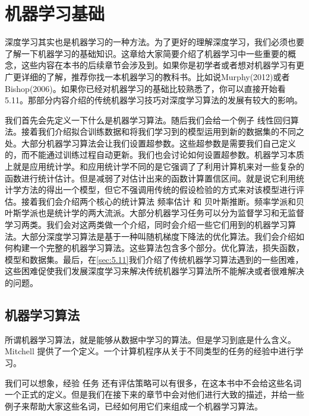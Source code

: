 \chapter{机器学习基础}
\label{chap:5}

深度学习其实也是机器学习的一种方法。为了更好的理解深度学习，我们必须也要了解一下机器学习的基础知识。这章给大家简要介绍了机器学习中一些重要的概念，这些内容在本书的后续章节会涉及到。如果你是初学者或者想对机器学习有更广更详细的了解，推荐你找一本机器学习的教科书。比如说Murphy(2012)或者Bishop(2006)。如果你已经对机器学习的基础比较熟悉了，你可以直接开始看5.11。那部分内容介绍的传统机器学习技巧对深度学习算法的发展有较大的影响。

我们首先会先定义一下什么是机器学习算法。随后我们会给一个例子 线性回归算法。接着我们介绍拟合训练数据和将我们学习到的模型运用到新的数据集的不同之处。大部分机器学习算法会让我们设置超参数。这些超参数是需要我们自己定义的，而不能通过训练过程自动更新。我们也会讨论如何设置超参数。机器学习本质上就是应用统计学。和应用统计学不同的是它强调了了利用计算机来对一些复杂的函数进行统计估计。但是减弱了对估计出来的函数计算置信区间。就是说它利用统计学方法的得出一个模型，但它不强调用传统的假设检验的方式来对该模型进行评估。接着我们会介绍两个核心的统计算法 频率估计 和 贝叶斯推断。频率学派和贝叶斯学派也是统计学的两大流派。大部分机器学习任务可以分为监督学习和无监督学习两类。我们会对这两类做一个介绍，同时会介绍一些它们用到的机器学习算法。大部分深度学习算法是基于一种叫随机梯度下降法的优化算法。我们会介绍如何构建一个完整的机器学习算法。这些算法包含多个部分。优化算法，损失函数，模型和数据集。最后，在\ref{sec:5.11}我们介绍了传统机器学习算法遇到的一些困难，这些困难促使我们发展深度学习来解决传统机器学习算法所不能解决或者很难解决的问题。

\section{机器学习算法}
\label{sec:5.1}

所谓机器学习算法，就是能够从数据中学习的算法。但是学习到底是什么含义。Mitchell 提供了一个定义。一个计算机程序从关于不同类型的任务的经验中进行学习。

我们可以想象，经验 任务 还有评估策略可以有很多，在这本书中不会给这些名词一个正式的定义。但是我们在接下来的章节中会对他们进行大致的描述，并给一些例子来帮助大家这些名词，已经如何用它们来组成一个机器学习算法。

